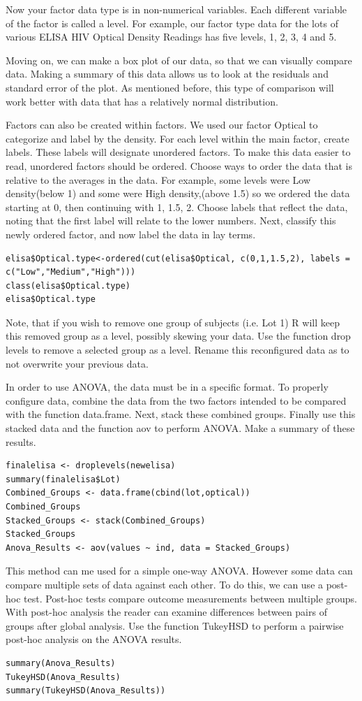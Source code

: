 \documentclass[11pt]{article}
\begin{document}
Now your factor data type is in non-numerical variables. Each different variable of the factor is called a level. For example, our factor type data for the lots of various ELISA HIV Optical Density Readings has five levels, 1, 2, 3, 4 and 5.

Moving on, we can make a box plot of our data, so that we can visually compare data. Making a summary of this data allows us to look at the residuals and standard error of the plot. As mentioned before, this type of comparison will work better with data that has a relatively normal distribution. 

Factors can also be created within factors. We used our factor Optical to categorize and label by the density. For each level within the main factor, create labels. These labels will designate unordered factors. To make this data easier to read, unordered factors should be ordered. Choose ways to order the data that is relative to the averages in the data. For example, some levels were Low density(below 1) and some were High density,(above 1.5) so we ordered the data starting at 0, then continuing with 1, 1.5, 2. Choose labels that reflect the data, noting that the first label will relate to the lower numbers. Next, classify this newly ordered factor, and now label the data in lay terms. 
\begin{lstlisting}
elisa$Optical.type<-ordered(cut(elisa$Optical, c(0,1,1.5,2), labels = c("Low","Medium","High")))
class(elisa$Optical.type)
elisa$Optical.type
\end{lstlisting}
Note, that if you wish to remove one group of subjects (i.e. Lot 1) R will keep this removed group as a level, possibly skewing your data. Use the function drop levels to remove a selected group as a level. Rename this reconfigured data as to not overwrite your previous data. 

In order to use ANOVA, the data must be in a specific format. To properly configure data, combine the data from the two factors intended to be compared with the function data.frame. Next, stack these combined groups. Finally use this stacked data and the function aov to perform ANOVA. Make a summary of these results.
\begin{lstlisting}
finalelisa <- droplevels(newelisa)
summary(finalelisa$Lot)
Combined_Groups <- data.frame(cbind(lot,optical))
Combined_Groups
Stacked_Groups <- stack(Combined_Groups)
Stacked_Groups
Anova_Results <- aov(values ~ ind, data = Stacked_Groups)
\end{lstlisting}
This method can me used for a simple one-way ANOVA. However some data can compare multiple sets of data against each other. To do this, we can use a post-hoc test. Post-hoc tests compare outcome measurements between multiple groups. With post-hoc analysis the reader can examine differences between pairs of groups after global analysis. Use the function TukeyHSD to perform a pairwise post-hoc analysis on the ANOVA results.
\begin{lstlisting}
summary(Anova_Results)
TukeyHSD(Anova_Results)
summary(TukeyHSD(Anova_Results))
\end{lstlisting}
\end{document}
